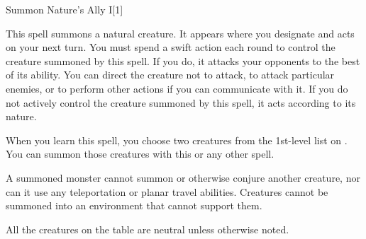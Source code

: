 \begin{spellsection}{Summon Nature's Ally I}[1]\hypertarget{spell:summon nature's ally}{}
    \begin{spellheader}
    \end{spellheader}
    \begin{spellcontent}
        \begin{spelltargetinginfo}
            \spellrng{\rngclose}
        \end{spelltargetinginfo}
        \begin{spelleffects}
            \spelleffect This spell summons a natural creature. It appears where you designate and acts on your next turn. You must spend a swift action each round to control the creature summoned by this spell. If you do, it attacks your opponents to the best of its ability. You can direct the creature not to attack, to attack particular enemies, or to perform other actions if you can communicate with it. If you do not actively control the creature summoned by this spell, it acts according to its nature.
            \par When you learn this spell, you choose two creatures from the 1st-level list on . You can summon those creatures with this or any other  spell.
            \par A summoned monster cannot summon or otherwise conjure another creature, nor can it use any teleportation or planar travel abilities. Creatures cannot be summoned into an environment that cannot support them.
            \par All the creatures on the table are neutral unless otherwise noted.
            \spelldur \durshort \dismissable
        \end{spelleffects}
    \end{spellcontent}
    \begin{spellfooter}
        \miscastexplode
    \end{spellfooter}
\end{spellsection}


